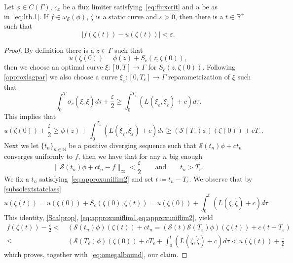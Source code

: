 \documentclass[11pt,a4paper,american]{article}
\newcommand{\Nds}{\mathds N}
\newcommand{\Rds}{\mathds R}
\newcommand{\Scal}{\mathcal S}
\begin{document}
    \begin{lem}\label{approxuniflim}
        Let $\phi\in C(\Gamma)$, $c_x$ be a flux limiter satisfying~\cref{eq:fluxcrit} and $u$ be as in~\cref{eq:ltb.1}. If $f\in\omega_\Scal(\phi)$, $\zeta$ is a static curve and $\varepsilon>0$, then there is a $t\in\Rds^+$ such that
        \begin{equation*}
            |f(\zeta(t))-u(\zeta(t))|<\varepsilon.
        \end{equation*}
    \end{lem}
    \begin{proof}
        By definition there is a $z\in\Gamma$ such that
        \begin{equation*}
            u(\zeta(0))=\phi(z)+S_c(z,\zeta(0)),
        \end{equation*}
        then we choose an optimal curve $\xi:[0,T]\to\Gamma$ for $S_c(z,\zeta(0))$. Following \cref{approxlagpar} we also choose a curve $\xi_\varepsilon:[0,T_\varepsilon]\to\Gamma$ reparametrization of $\xi$ such that
        \begin{equation*}
            \int_0^T\sigma_c\left(\xi,\dot\xi\right)d\tau+\frac\varepsilon2\ge\int_0^{T_\varepsilon}\left(L\left(\xi_\varepsilon,\dot\xi_\varepsilon\right)+c\right)d\tau.
        \end{equation*}
        This implies that
        \begin{equation}\label{eq:approxuniflim1}
            u(\zeta(0))+\frac\varepsilon2\ge\phi(z)+\int_0^{T_\varepsilon}\left(L\left(\xi_\varepsilon,\dot\xi_\varepsilon\right)+c\right)d\tau\ge(\Scal(T_\varepsilon)\phi)(\zeta(0))+cT_\varepsilon.
        \end{equation}
        Next we let $\{t_n\}_{n\in\Nds}$ be a positive diverging sequence such that $\Scal(t_n)\phi+ct_n$ converges uniformly to $f$, then we have that for any $n$ big enough
        \begin{equation}\label{eq:approxuniflim2}
            \|\Scal(t_n)\phi+ct_n-f\|_\infty<\frac\varepsilon2\qquad\text{and}\qquad t_n>T_\varepsilon.
        \end{equation}
        We fix a $t_n$ satisfying~\cref{eq:approxuniflim2} and set $t\coloneqq t_n-T_\varepsilon$. We observe that by \cref{subsolextstatclass}
        \begin{equation*}
            u(\zeta(t))=u(\zeta(0))+S_c(\zeta(0),\zeta(t))=u(\zeta(0))+\int_0^t\left(L\left(\zeta,\dot\zeta\right)+c\right)d\tau.
        \end{equation*}
        This identity, \cref{Scalprop}, \cref{eq:approxuniflim1,eq:approxuniflim2}, yield
        \begin{align*}
            f(\zeta(t))-\frac\varepsilon2<&\,(\Scal(t_n)\phi)(\zeta(t))+ct_n=(\Scal(t)\Scal(T_\varepsilon)\phi)(\zeta(t))+c(t+T_\varepsilon)\\
            \le&\,(\Scal(T_\varepsilon)\phi)(\zeta(0))+cT_\varepsilon+\int_0^t\left(L\left(\zeta,\dot\zeta\right)+c\right)d\tau<u(\zeta(t))+\frac\varepsilon2
        \end{align*}
        which proves, together with~\cref{eq:omegalbound}, our claim.
    \end{proof}
\end{document}
